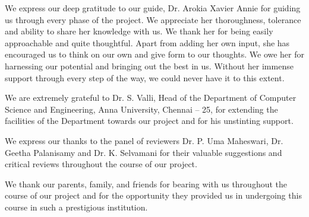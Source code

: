  We express our deep gratitude to our guide, Dr. Arokia Xavier Annie for guiding us through every phase of the project. We appreciate her thoroughness, tolerance and ability to share her knowledge with us. We thank her for being easily approachable and quite thoughtful. Apart from adding her own input, she has encouraged us to think on our own and give form to our thoughts. We owe her for harnessing our potential and bringing out the best in us. Without her immense support through every step of the way, we could never have it to this extent.
    
    We are extremely grateful to Dr. S. Valli, Head of the
Department of Computer Science and Engineering, Anna University,
Chennai – 25, for extending the facilities of the Department towards our project and for his unstinting support.
    
    We express our thanks to the panel of reviewers Dr. P. Uma Maheswari, Dr. Geetha Palanisamy and Dr. K. Selvamani for their
valuable suggestions and critical reviews throughout the course of our project.
    
    We thank our parents, family, and friends for bearing with us
throughout the course of our project and for the opportunity they provided us in undergoing this course in such a prestigious institution.
